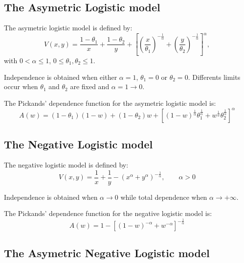 \documentclass[a4paper]{article}
\numberwithin{equation}{section}
\theoremstyle{definition}
\begin{document}
\subsection{The Asymetric Logistic model}

The asymetric logistic model is defined by:
\begin{displaymath}
  V(x,y) = \frac{1 - \theta_1}{x} + \frac{1 - \theta_2}{y} + \left[
    \left(\frac{x}{\theta_1} \right)^{-\frac{1}{\alpha}} +
      \left(\frac{y}{\theta_2} \right)^{-\frac{1}{\alpha}}
    \right]^\alpha,
\end{displaymath}
with $0 < \alpha \leq 1$, $0 \leq \theta_1, \theta_2 \leq 1$.

Independence is obtained when either $\alpha=1$, $\theta_1=0$ or
$\theta_2=0$. Differents limits occur when $\theta_1$ and $\theta_2$
are fixed and $\alpha=1 \rightarrow 0$.

The Pickands' dependence function for the asymetric logistic model is:
\begin{displaymath}
  A(w) = \left(1 - \theta_1 \right) \left(1 - w\right) +  \left(1 -
    \theta_2 \right) w + \left[ (1 - w)^{\frac{1}{\alpha}}
    \theta_1^{\frac{1}{\alpha}} + w^{\frac{1}{\alpha}}
    \theta_2^{\frac{1}{\alpha}} \right]^{\alpha}
\end{displaymath}

\subsection{The Negative Logistic model}

The negative logistic model is defined by:
\begin{equation}
  \label{eq:negLog}
  V(x,y) = \frac{1}{x} + \frac{1}{y} - \left(x^{\alpha} + y^{\alpha}
  \right)^{-\frac{1}{\alpha}}, \qquad \alpha > 0
\end{equation}

Independence is obtained when $\alpha \rightarrow 0$ while total
dependence when $\alpha \rightarrow +\infty$. 

The Pickands' dependence function for the negative logistic model is:
\begin{displaymath}
  A(w) = 1 - \left[ (1 - w)^{-\alpha} + w^{-\alpha}
  \right]^{-\frac{1}{\alpha}}
\end{displaymath} 

\subsection{The Asymetric Negative Logistic model}
\end{document}

